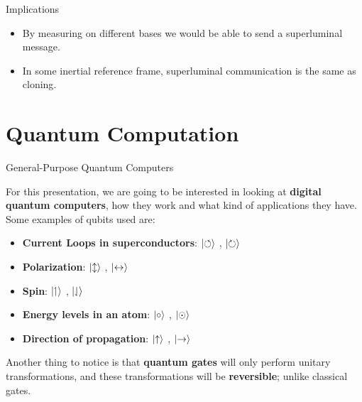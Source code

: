 \documentclass[9pt, handout, aspectratio=169]{beamer}	%
\begin{document}
\begin{frame}{Implications}
		\pause

		\begin{itemize}
		\item By measuring on different bases we would be able to send a superluminal message. \pause
		\item In some inertial reference frame, superluminal communication is the same as cloning.
		\end{itemize}

	\end{frame}




\section{Quantum Computation}

	\begin{frame}{General-Purpose Quantum Computers}

		For this presentation, we are going to be interested in looking at \textbf{digital quantum computers}, how they work and what kind of applications they have. Some examples of qubits used are:

		\pause
		\vspace{8pt}
		\begin{itemize}
			\item \textbf{Current Loops in superconductors}: $\ket{\circlearrowleft}$ , $\ket{\circlearrowright}$
			\item \textbf{Polarization}: $\ket{\updownarrow}$ , $\ket{\leftrightarrow}$
			\item \textbf{Spin}: $\ket{\upharpoonleft}$ , $\ket{\downharpoonleft}$
			\item \textbf{Energy levels in an atom}: $\ket{\circ}$ , $\ket{\odot}$
			\item \textbf{Direction of propagation}: $\ket{\uparrow}$ , $\ket{\rightarrow}$
		\end{itemize}

		\pause
		\vspace{8pt}
		Another thing to notice is that \textbf{quantum gates} will only perform unitary transformations, and these transformations will be \textbf{reversible}; unlike classical gates.

	\end{frame}
\end{document}
